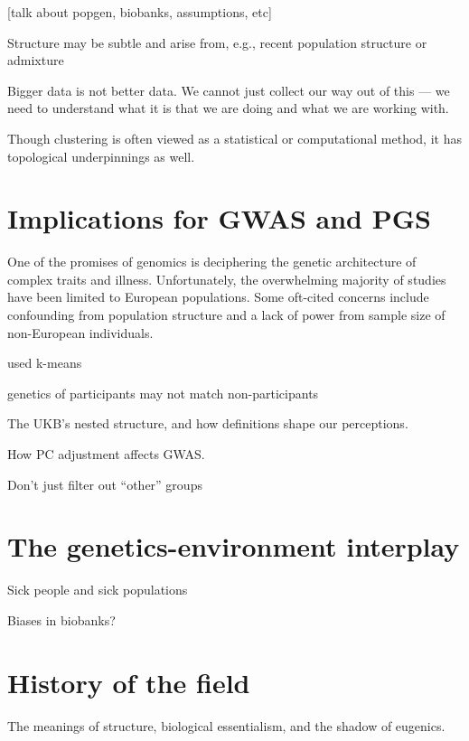 [talk about popgen, biobanks, assumptions, etc]


Structure may be subtle and arise from, e.g., recent population structure or admixture\citep{gopalan_human_2022}

Bigger data is not better data. We cannot just collect our way out of this --- we need to understand what it is that we are doing and what we are working with.



Though clustering is often viewed as a statistical or computational method, it has topological underpinnings as well.



\section{Implications for GWAS and PGS}

One of the promises of genomics is deciphering the genetic architecture of complex traits and illness. Unfortunately, the overwhelming majority of studies have been limited to European populations\citep{fatumo_roadmap_2022}\citep{kaplan_polygenic_2022}. Some oft-cited concerns include confounding from population structure and a lack of power from sample size of non-European individuals\citep{ben-eghan_dont_2020}. 

used k-means\citep{sun_analyses_2022}

genetics of participants may not match non-participants
\citep{benonisdottir_studying_2023}

The UKB's nested structure, and how definitions shape our perceptions.

How PC adjustment affects GWAS.

Don't just filter out ``other'' groups


\section{The genetics-environment interplay}

Sick people and sick populations\citep{rose_sick_2001}

Biases in biobanks?

\section{History of the field}

The meanings of structure, biological essentialism, and the shadow of eugenics.

